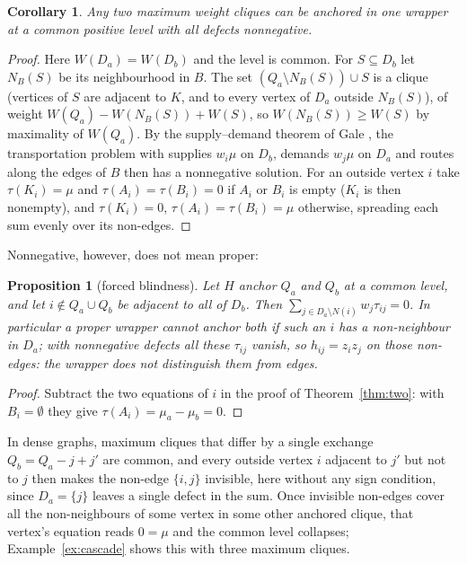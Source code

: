 \documentclass[11pt]{article}
\newtheorem{prop}[thm]{Proposition}
\newtheorem{cor}[thm]{Corollary}
\theoremstyle{definition}
\theoremstyle{remark}
\begin{document}
\begin{cor}
\label{cor:twomax}
Any two maximum weight cliques can be anchored in one wrapper at a common
positive level with all defects nonnegative.
\end{cor}
\begin{proof}
Here $W(D_a)=W(D_b)$ and the level is common. For $S\subseteq D_b$ let
$N_B(S)$ be its neighbourhood in $B$. The set $(Q_a\setminus N_B(S))\cup S$
is a clique (vertices of $S$ are adjacent to $K$, and to every vertex of
$D_a$ outside $N_B(S)$), of weight $W(Q_a)-W(N_B(S))+W(S)$, so
$W(N_B(S))\geq W(S)$ by maximality of $W(Q_a)$. By the supply--demand
theorem of Gale \cite{G57}, the transportation problem with supplies
$w_i\mu$ on $D_b$, demands $w_j\mu$ on $D_a$ and routes along the edges of
$B$ then has a nonnegative solution. For an outside vertex $i$ take
$\tau(K_i)=\mu$ and $\tau(A_i)=\tau(B_i)=0$ if $A_i$ or $B_i$ is empty
($K_i$ is then nonempty), and $\tau(K_i)=0$, $\tau(A_i)=\tau(B_i)=\mu$
otherwise, spreading each sum evenly over its non-edges.
\end{proof}

Nonnegative, however, does not mean proper:

\begin{prop}[forced blindness]
\label{prop:blind}
Let $H$ anchor $Q_a$ and $Q_b$ at a common level, and let
$i\notin Q_a\cup Q_b$ be adjacent to all of $D_b$. Then
$\sum_{j\in D_a\setminus N(i)}w_j\tau_{ij}=0$. In particular a proper
wrapper cannot anchor both if such an $i$ has a non-neighbour in $D_a$;
with nonnegative defects all these $\tau_{ij}$ vanish, so $h_{ij}=z_iz_j$ on
those non-edges: the wrapper does not distinguish them from edges.
\end{prop}
\begin{proof}
Subtract the two equations of $i$ in the proof of Theorem~\ref{thm:two}:
with $B_i=\emptyset$ they give $\tau(A_i)=\mu_a-\mu_b=0$.
\end{proof}

In dense graphs, maximum cliques that differ by a single exchange
$Q_b=Q_a-j+j'$ are common, and every outside vertex $i$ adjacent to $j'$ but
not to $j$ then makes the non-edge $\{i,j\}$ invisible, here without any sign
condition, since $D_a=\{j\}$ leaves a single defect in the sum. Once invisible
non-edges cover all the non-neighbours of some vertex in some other anchored
clique, that vertex's equation reads $0=\mu$ and the common level collapses;
Example~\ref{ex:cascade} shows this with three maximum cliques.
\end{document}
